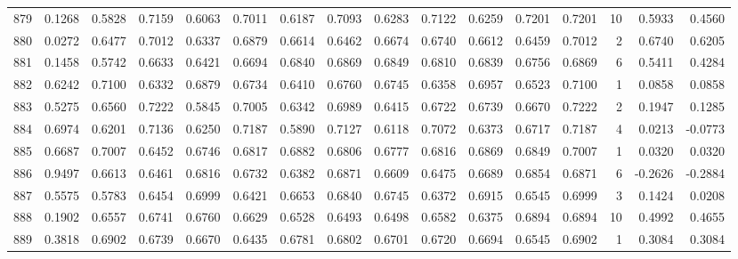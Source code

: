\begin{tabular}{lrrrrrrrrrrrrrrr}
879 &      0.1268 &  0.5828 &  0.7159 &  0.6063 &  0.7011 &  0.6187 &  0.7093 &  0.6283 &  0.7122 &  0.6259 &   0.7201 &     0.7201 &     10 &                    0.5933 &                     0.4560 \\
880 &      0.0272 &  0.6477 &  0.7012 &  0.6337 &  0.6879 &  0.6614 &  0.6462 &  0.6674 &  0.6740 &  0.6612 &   0.6459 &     0.7012 &      2 &                    0.6740 &                     0.6205 \\
881 &      0.1458 &  0.5742 &  0.6633 &  0.6421 &  0.6694 &  0.6840 &  0.6869 &  0.6849 &  0.6810 &  0.6839 &   0.6756 &     0.6869 &      6 &                    0.5411 &                     0.4284 \\
882 &      0.6242 &  0.7100 &  0.6332 &  0.6879 &  0.6734 &  0.6410 &  0.6760 &  0.6745 &  0.6358 &  0.6957 &   0.6523 &     0.7100 &      1 &                    0.0858 &                     0.0858 \\
883 &      0.5275 &  0.6560 &  0.7222 &  0.5845 &  0.7005 &  0.6342 &  0.6989 &  0.6415 &  0.6722 &  0.6739 &   0.6670 &     0.7222 &      2 &                    0.1947 &                     0.1285 \\
884 &      0.6974 &  0.6201 &  0.7136 &  0.6250 &  0.7187 &  0.5890 &  0.7127 &  0.6118 &  0.7072 &  0.6373 &   0.6717 &     0.7187 &      4 &                    0.0213 &                    -0.0773 \\
885 &      0.6687 &  0.7007 &  0.6452 &  0.6746 &  0.6817 &  0.6882 &  0.6806 &  0.6777 &  0.6816 &  0.6869 &   0.6849 &     0.7007 &      1 &                    0.0320 &                     0.0320 \\
886 &      0.9497 &  0.6613 &  0.6461 &  0.6816 &  0.6732 &  0.6382 &  0.6871 &  0.6609 &  0.6475 &  0.6689 &   0.6854 &     0.6871 &      6 &                   -0.2626 &                    -0.2884 \\
887 &      0.5575 &  0.5783 &  0.6454 &  0.6999 &  0.6421 &  0.6653 &  0.6840 &  0.6745 &  0.6372 &  0.6915 &   0.6545 &     0.6999 &      3 &                    0.1424 &                     0.0208 \\
888 &      0.1902 &  0.6557 &  0.6741 &  0.6760 &  0.6629 &  0.6528 &  0.6493 &  0.6498 &  0.6582 &  0.6375 &   0.6894 &     0.6894 &     10 &                    0.4992 &                     0.4655 \\
889 &      0.3818 &  0.6902 &  0.6739 &  0.6670 &  0.6435 &  0.6781 &  0.6802 &  0.6701 &  0.6720 &  0.6694 &   0.6545 &     0.6902 &      1 &                    0.3084 &                     0.3084 \\

\end{tabular}
